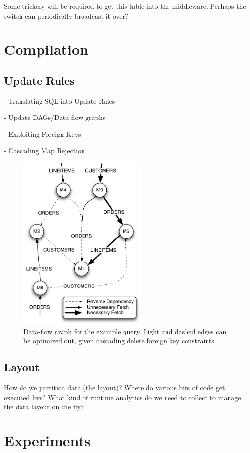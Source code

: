 \documentclass{sig-alternate}
\begin{document}
Some trickery will be required to get this table into the middleware.  Perhaps the switch can periodically broadcast it over?

\section{Compilation}
\label{sec:compilation}

\subsection{Update Rules}
- Translating SQL into Update Rules

- Update DAGs/Data flow graphs

- Exploiting Foreign Keys

- Cascading Map Rejection

\begin{figure}
\begin{center}
\includegraphics[width=2.5in]{images/q12_graph.pdf}
\caption{Data-flow graph for the example query.  Light and dashed edges can be optimized out, given cascading delete foreign key constraints.}
\label{fig:dataflow}
\end{center}
\end{figure}

\subsection{Layout}
How do we partition data (the layout)?  Where do various bits of code get executed live?  What kind of runtime analytics do we need to collect to manage the data layout on the fly? 


\section{Experiments}
\label{sec:experiments}
\end{document}
